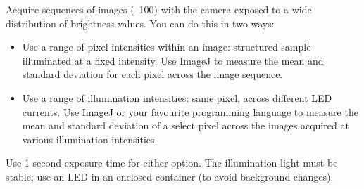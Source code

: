 \documentclass[a4paper]{report}
\newcommand{\nexercise}[0]{\arabic{exercises}\addtocounter{exercises}{1}}
\begin{document}
\begin{exercisebox}[frametitle={Exercise \nexercise: Measure shot noise}]
Acquire sequences of images (~100) with the camera exposed to a wide distribution of brightness values. You can do this in two ways:
\begin{itemize}
	\item Use a range of pixel intensities within an image: structured sample illuminated at a fixed intensity. Use ImageJ to measure the mean and standard deviation for each pixel across the image sequence.
	\item Use a range of illumination intensities: same pixel, across different LED currents. Use ImageJ or your favourite programming language to measure the mean and standard deviation of a select pixel across the images acquired at various illumination intensities.
\end{itemize}

Use 1 second exposure time for either option. The illumination light must be stable; use an LED in an enclosed container (to avoid background changes). 
\end{exercisebox}
\end{document}

